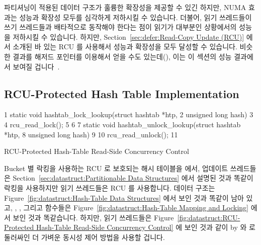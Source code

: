 파티셔닝이 적용된 데이터 구조가 훌륭한 확장성을 제공할 수 있긴 하지만, NUMA
효과는 성능과 확장성 모두를 심각하게 저하시킬 수 있습니다.
더불어, 읽기 쓰레드들이 쓰기 쓰레드들과 배타적으로 동작해야 한다는 점이 읽기가
대부분인 상황에서의 성능을 저하시킬 수 있습니다.
하지만,
Section~\ref{sec:defer:Read-Copy Update (RCU)} 에서 소개된 바 있는 RCU 를
사용해서 성능과 확장성을 모두 달성할 수 있습니다.
비슷한 결과를 해저드 포인터를 이용해서 얻을 수도 있는데(), 이는
이 섹션의 성능 결과에서 보여질 겁니다~\cite{McKenney:2013:SDS:2483852.2483867}.

\subsection{RCU-Protected Hash Table Implementation}
\label{sec:datastruct:RCU-Protected Hash Table Implementation}

\begin{listing}[tb]
{ \scriptsize
\begin{verbbox}
 1 static void hashtab_lock_lookup(struct hashtab *htp,
 2                                 unsigned long hash)
 3 {
 4   rcu_read_lock();
 5 }
 6 
 7 static void hashtab_unlock_lookup(struct hashtab *htp,
 8                                   unsigned long hash)
 9 {
10   rcu_read_unlock();
11 }
\end{verbbox}
}
\centering
\theverbbox
\caption{RCU-Protected Hash-Table Read-Side Concurrency Control}
\label{lst:datastruct:RCU-Protected Hash-Table Read-Side Concurrency Control}
\end{listing}

Bucket 별 락킹을 사용하는 RCU 로 보호되는 해시 테이블을 에서, 업데이트
쓰레드들은
Section~\ref{sec:datastruct:Partitionable Data Structures} 에서 설명된 것과
똑같이 락킹을 사용하지만 읽기 쓰레드들은 RCU 를 사용합니다.
데이터 구조는
Figure~\ref{fig:datastruct:Hash-Table Data Structures} 에서 보인 것과 똑같이
남아 있고,
, , 그리고  함수들은
Figure~\ref{fig:datastruct:Hash-Table Mapping and Locking} 에서 보인 것과
똑같습니다.
하지만, 읽기 쓰레드들은
Figure~\ref{fig:datastruct:RCU-Protected Hash-Table Read-Side Concurrency
Control} 에 보인 것과 같이
by  와  로 둘러싸인 더
가벼운 동시성 제어 방법을 사용할 겁니다.
\iffalse

